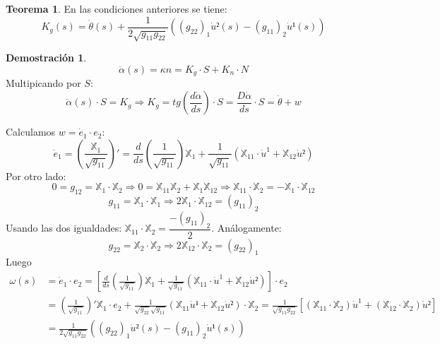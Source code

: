 \documentclass[twoside]{report}
\theoremstyle{definition}
\newtheorem{theorem}{Teorema}[section]
\newtheorem*{dem}{Demostración}
\numberwithin{equation}{section}
\newcommand{\X}{\mathbb{X}}
\begin{document}
\begin{theorem}
En las condiciones anteriores se tiene:
\[ K_g(s) = \dot{θ}(s) + \frac{1}{2 \sqrt{g_{11}g_{22}}} \left((g_{22})_1 \dot{u}²(s) - (g_{11})_2 \dot{u}¹(s) \right)\]
\end{theorem}

\begin{dem}
\[ \ddot{α}(s) = κ n = K_g \cdot S + K_n \cdot N \]
Multipicando por $S$:
\[ \ddot{α}(s) \cdot S = K_g \Rightarrow K_g = tg\left(\frac{d\dot{α}}{ds}\right) \cdot S = \frac{D\dot{α}}{ds} \cdot S = \dot{θ} + w \]
\end{dem}

Calculamos $w=\dot{e}_1 \cdot e_2$:
\[ \dot{e}_1 = \left(\frac{\X_1}{\sqrt{g_{11}}}\right)' = \frac{d}{ds} \left(\frac{1}{\sqrt{g_{11}}}\right) \X_1 + \frac{1}{\sqrt{g_{11}}} (\X_{11} \cdot \dot{u}^1 + \X_{12} \dot{u}²) \]
Por otro lado:
\[ 0 = g_{12} = \X_1 \cdot \X_2 \Rightarrow 0 = \X_{11} \X_2 + \X_1 \X_{12} \Rightarrow \X_{11} \cdot \X_2 = - \X_1 \cdot \X_{12} \]
\[ g_{11} = \X_1 \cdot \X_1 \Rightarrow 2 \X_1 \cdot \X_{12} = (g_{11})_2 \]
Usando las dos igualdades: $\X_{11}\cdot \X_2 = \dfrac{-(g_{11})_2}{2}$. Análogamente:
\[ g_{22} = \X_2 \cdot \X_2 \Rightarrow 2 \X_{12} \cdot \X_2 = (g_{22})_1 \]
Luego
\begin{align*} 
ω(s) & = \dot{e}_1 \cdot e_2 = \left[\frac{d}{ds} (\frac{1}{\sqrt{g_{11}}}) \X_1 + \frac{1}{\sqrt{g_{11}}} (\X_{11} \cdot \dot{u}^1 + \X_{12} \dot{u}²)\right] \cdot e_2 \\
	& = \left(\frac{1}{\sqrt{g_{11}}}\right)' \X_1 \cdot e_2 + \frac{1}{\sqrt{g_{22}}\sqrt{g_{11}}} (\X_{11} \dot{u}¹+ \X_{12} \dot{u}²) \cdot \X_2 = \frac{1}{\sqrt{g_{11} g_{22}}}
	\left[(\X_{11} \cdot \X_2)  \dot{u}^1 + (\X_{12} \cdot \X_2) \dot{u}²\right] \\
	& = \frac{1}{2 \sqrt{g_{11}g_{22}}} \left((g_{22})_1 \dot{u}²(s) - (g_{11})_2 \dot{u}¹(s) \right)
\end{align*}
\newpage
\end{document}
